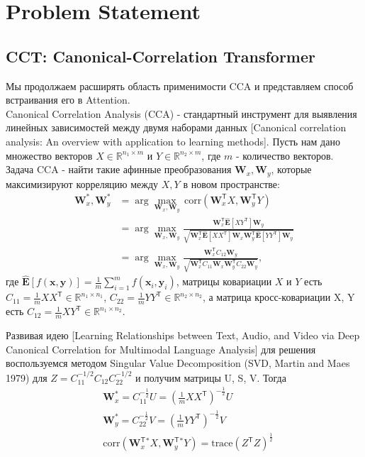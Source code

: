 \documentclass[a4paper,14pt]{article}
\newcommand{\bx}{\mathbf{x}}
\newcommand{\by}{\mathbf{y}}
\newcommand{\bW}{\mathbf{W}}
\newcommand{\bE}{\mathbf{E}}
\newcommand{\dR}{\mathbb{R}}
\newcommand{\T}{^{\mathsf{T}}}
\theoremstyle{plain} %
\theoremstyle{definition} %
\theoremstyle{remark} %
\begin{document}
        \section{Problem Statement}
        \subsection{CCT: Canonical-Correlation Transformer}
        Мы продолжаем расширять область применимости CCA и представляем способ встраивания его в Attention.\\
        Canonical Correlation Analysis (CCA) - стандартный инструмент для выявления линейных зависимостей между двумя наборами данных [Canonical correlation analysis: An overview with application to learning methods]. Пусть нам дано множество векторов $X\in \dR^{n_1\times m}$ и $Y\in \dR^{n_2\times m}$, где $m$ - количество векторов. Задача CCA - найти такие афинные преобразования $\bW_x, \bW_y$, которые максимизируют корреляцию между $X, Y$ в новом пространстве:
        \begin{equation}
            \begin{aligned}
            \bW^{*}_x, \bW^{*}_y &= \arg\max_{\bW_x, \bW_y} \, \text{corr}(\bW_x\T X, \bW_y\T Y) \\
            &= \arg\max_{\bW_x, \bW_y}\frac{\bW_x\T \hat{\bE}[XY\T] \bW_y}{\sqrt{\bW_x\T \hat{\bE}[XX\T] \bW_x \bW_y\T \hat{\bE}[YY\T] \bW_y}} \\
            &= \arg\max_{\bW_x, \bW_y}\frac{\bW_x\T C_{12} \bW_y}{\sqrt{\bW_x\T C_{11} \bW_x \bW_y\T C_{22} \bW_y}},
            \end{aligned}
        \end{equation}
        где $\hat{\bE}[f(\bx, \by)] = \frac{1}{m}\sum\limits_{i=1}^{m}f(\bx_i, \by_i)$, матрицы ковариации $X$ и $Y$ есть $C_{11} = \frac{1}{m}XX\T \in \dR^{n_1\times n_1}$, $C_{22} = \frac{1}{m}YY\T \in \dR^{n_2\times n_2}$, а матрица кросс-ковариации X, Y есть $C_{12} = \frac{1}{m}XY\T \in\dR^{n_1\times n_2}$.

        Развивая идею [Learning Relationships between Text, Audio, and Video via Deep Canonical Correlation for Multimodal Language Analysis] для решения воспользуемся методом Singular Value Decomposition (SVD, Martin and Maes 1979) для $Z = C_{11}^{-1/2}C_{12}C_{22}^{-1/2}$ и получим матрицы U, S, V. Тогда
        \begin{equation}
            \begin{aligned}
                &\bW_x^* = C_{11}^{-\frac{1}{2}}U = (\frac{1}{m}XX\T)^{-\frac{1}{2}}U \\
                &\bW_y^* = C_{22}^{-\frac{1}{2}}V = (\frac{1}{m}YY\T)^{-\frac{1}{2}}V \\
                &\text{corr}(\bW_x\T^* X, \bW_y\T^* Y) = \text{trace}(Z\T Z)^{\frac{1}{2}}
            \end{aligned}
        \end{equation}
\end{document}
